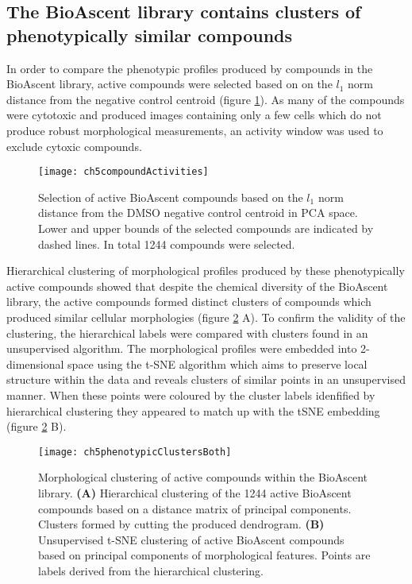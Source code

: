\documentclass[a4paper,11pt,twoside,openright]{scrbook}
\begin{document}
\subsection{The BioAscent library contains clusters of phenotypically similar compounds}

In order to compare the phenotypic profiles produced by compounds in the BioAscent library, active compounds were selected based on on the $l_1$ norm distance from the negative control centroid (figure \ref{figure:compound_activity}).
As many of the compounds were cytotoxic and produced images containing only a few cells which do not produce robust morphological measurements, an activity window was used to exclude cytoxic compounds.


\begin{figure}
    \captionsetup{width=0.8\textwidth}
    \caption[Selecting active compounds based on distance]{
Selection of active BioAscent compounds based on the $l_1$ norm distance from the DMSO negative control centroid in PCA space.
Lower and upper bounds of the selected compounds are indicated by dashed lines. In total 1244 compounds were selected.}
    \texttt{[image: ch5compoundActivities]}
    \label{figure:compound_activity}
\end{figure}

Hierarchical clustering of morphological profiles produced by these phenotypically active compounds showed that despite the chemical diversity of the BioAscent library, the active compounds formed distinct clusters of compounds which produced similar cellular morphologies (figure \ref{figure:morph_cluster} A).
To confirm the validity of the clustering, the hierarchical labels were compared with clusters found in an unsupervised algorithm.
The morphological profiles were embedded into 2-dimensional space using the t-SNE algorithm \cite{Maaten2008} which aims to preserve local structure within the data and reveals clusters of similar points in an unsupervised manner.
When these points were coloured by the cluster labels idenfified by hierarchical clustering they appeared to match up with the tSNE embedding (figure \ref{figure:morph_cluster} B).

\begin{figure}
    \captionsetup{width=0.8\textwidth}
    \caption[Morphological clustering of the BioAscent library]{
Morphological clustering of active compounds within the BioAscent library.
    \textbf{(A)} Hierarchical clustering of the 1244 active BioAscent compounds based on a distance matrix of principal components.
    Clusters formed by cutting the produced dendrogram.
    \textbf{(B)} Unsupervised t-SNE clustering of active BioAscent compounds based on principal components of morphological features.
    Points are labels derived from the hierarchical clustering.
}
    \texttt{[image: ch5phenotypicClustersBoth]}
    \label{figure:morph_cluster}
\end{figure}
\end{document}
